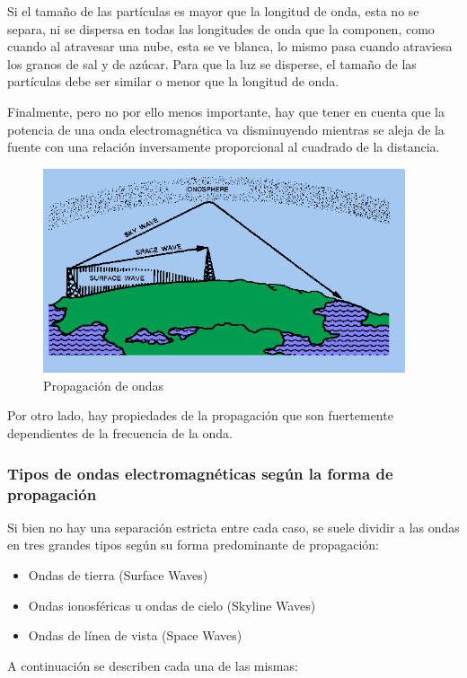 \begin{description}
  Si el tamaño de las partículas es mayor que la longitud de onda, esta no se separa, ni se dispersa en todas las longitudes de onda que la componen, como cuando al atravesar una nube, esta se ve blanca, lo mismo pasa cuando atraviesa los granos de sal y de azúcar. Para que la luz se disperse, el tamaño de las partículas debe ser similar o menor que la longitud de onda. 



  
\end{description}


Finalmente, pero no por ello menos importante, hay que tener en cuenta
que la potencia de una onda electromagn\'etica va disminuyendo
mientras se aleja de la fuente con una relaci\'on inversamente
proporcional al cuadrado de la distancia.



\begin{figure}[!h]
  \centering
  \includegraphics[width=0.95\textwidth]{06.radionavegacion/Imagenes/06.01.adf/propagacion-ondas.gif}
  \caption{Propagaci\'on de ondas}
  \label{fig:propagacion.de.ondas}
\end{figure}

Por otro lado, hay propiedades de la propagaci\'on que son fuertemente dependientes de la frecuencia de la onda. 



\subsubsection{Tipos de ondas electromagn\'eticas seg\'un la forma de propagaci\'on}
\label{sec:06.tipos.ondas.electromagneticas.segun.propagacion}

\begin{tcolorbox}
  Si bien no hay una separaci\'on estricta entre cada caso, se suele
  dividir a las ondas en tres grandes tipos seg\'un su forma
  predominante de propagaci\'on:

   \begin{itemize}
	\item Ondas de tierra (Surface Waves)
	\item Ondas ionosf\'ericas  u ondas de cielo (Skyline Waves)
	\item Ondas de l\'inea de vista (Space Waves)
        \end{itemize}
        
A continuaci\'on se describen cada una de las mismas:

\end{tcolorbox}

